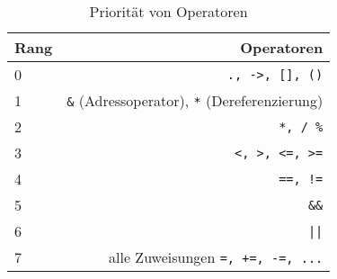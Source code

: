 \begin{table}
  \centering
  \begin{tabular}{l r}
    \hline
    Rang & Operatoren \\
    \hline
    0 & \texttt{., ->, [], ()}\\
    1 & \texttt{\&} (Adressoperator), \texttt{*} (Dereferenzierung)\\
    2 & \texttt{*, / \%}\\
    3 & \texttt{<, >, <=, >=}\\
    4 & \texttt{==, !=}\\
    5 & \texttt{\&\&}\\
    6 & \texttt{||}\\
    7 & alle Zuweisungen \texttt{=, +=, -=, ...}\\
    \hline
  \end{tabular}
  \caption{Priorität von Operatoren}
  \label{tab:prior}
\end{table}
